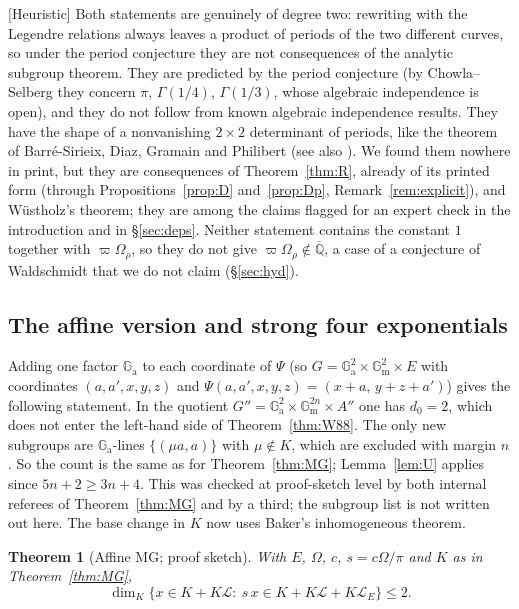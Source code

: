 \documentclass[11pt]{amsart}
\newtheorem{theorem}{Theorem}[section]
\theoremstyle{definition}
\newcommand{\Qb}{\overline{\mathbb{Q}}}
\newcommand{\Ga}{\mathbb{G}_{\mathrm a}}
\newcommand{\Gm}{\mathbb{G}_{\mathrm m}}
\newcommand{\Lg}{\mathcal{L}}
\newcommand{\vp}{\varpi}
\newcommand{\lab}[1]{\textup{[#1]}}
\begin{document}
\noindent \lab{Heuristic} Both statements are genuinely of degree two: rewriting with the Legendre relations always leaves
a product of periods of the two different curves, so under the period conjecture they are not consequences of the
analytic subgroup theorem. They are predicted by the period conjecture (by Chowla--Selberg \cite{Gr78} they concern $\pi$,
$\Gamma(1/4)$, $\Gamma(1/3)$, whose algebraic independence is open), and they do not follow from known algebraic
independence results. They have the shape of a nonvanishing $2\times2$ determinant of periods, like the theorem of
Barr\'e-Sirieix, Diaz, Gramain and Philibert \cite{BDGP96} (see also \cite{W06}). We found them nowhere in print, but
they are consequences of Theorem~\ref{thm:R}, already of its printed form \cite[Th\'eor\`eme (iii)]{RW93} (through
Propositions~\ref{prop:D} and~\ref{prop:Dp}, Remark~\ref{rem:explicit}), and W\"ustholz's theorem; they are
among the claims flagged for an expert check in the introduction and in \S\ref{sec:deps}. Neither statement contains the
constant $1$ together with $\vp\Omega_\rho$, so they do not give $\vp\Omega_\rho\notin\Qb$, a case of a conjecture of
Waldschmidt that we do not claim (\S\ref{sec:hyd}).

\subsection{The affine version and strong four exponentials}\label{sec:MGaff}
Adding one factor $\Ga$ to each coordinate of $\Psi$ (so $G=\Ga^2\times\Gm^2\times E$ with coordinates $(a,a',x,y,z)$ and
$\Psi(a,a',x,y,z)=(x+a,\,y+z+a')$) gives the following statement. In the quotient
$G''=\Ga^2\times\Gm^{2n}\times A''$ one has $d_0=2$, which does not enter the left-hand side of Theorem~\ref{thm:W88}. The
only new subgroups are $\Ga$-lines $\{(\mu a,a)\}$ with $\mu\notin K$, which are excluded with margin $n$. So the count is
the same as for Theorem~\ref{thm:MG}; Lemma~\ref{lem:U} applies since $5n+2\ge3n+4$. This was checked at proof-sketch level
by both internal referees of Theorem~\ref{thm:MG} and by a third; the subgroup list is not written out here. The base change
in $K$ now uses Baker's inhomogeneous theorem.

\begin{theorem}[Affine MG; proof sketch]\label{thm:MGaff}
With $E$, $\Omega$, $c$, $s=c\Omega/\pi$ and $K$ as in Theorem~\ref{thm:MG},
\[
\dim_K\{x\in K+K\Lg:\ s\,x\in K+K\Lg+K\Lg_E\}\le2 .
\]
\end{theorem}
\end{document}

